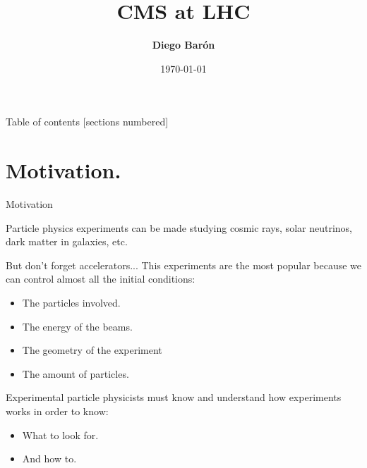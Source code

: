 \documentclass[8pt]{beamer}
\title{\textbf{CMS at LHC}}
\date{\today}
\author{\textbf{Diego Barón}}
\institute{Universidad de Antioquia, Instutito de Física.}
\begin{document}
\maketitle

\begin{frame}{Table of contents}
  [sections numbered]
  \tableofcontents[hideallsubsections]
\end{frame}


\section{Motivation.}

\begin{frame}[fragile]{Motivation}

Particle physics experiments can be made studying cosmic rays, solar neutrinos, dark matter in galaxies, etc. 

\begin{exampleblock}{But don't forget accelerators... }
This experiments are the most popular because we can control almost all the initial conditions:
\begin{itemize}
\item The particles involved.
\item The energy of the beams.
\item The geometry of the experiment
\item The amount of particles. 
\end{itemize}    
\end{exampleblock}

Experimental particle physicists must know and understand how experiments works in order to know:
\begin{itemize}
\item What to look for.
\item And how to.
\end{itemize}

\end{frame}
\end{document}
